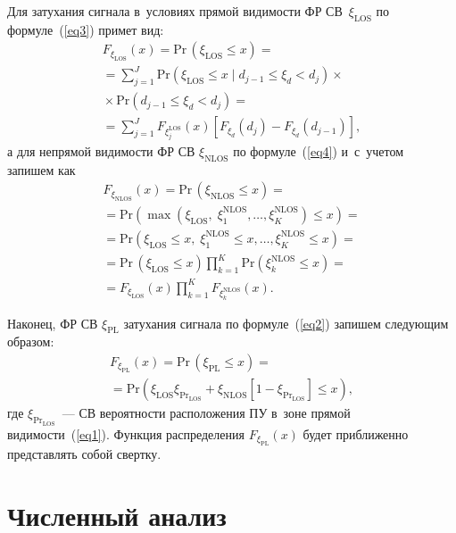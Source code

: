 \begin{multicols}{2}
Для затухания сигнала в~условиях прямой видимости ФР СВ~$\xi_{\mathrm{LOS}}$ по 
формуле~(\ref{eq3}) примет вид:
\begin{multline}
F_{\xi_{\mathrm{LOS}}}(x) =
\mathrm{Pr}\,(\xi_{\mathrm{LOS}} \leq x) = {} \\
{}= \sum\limits_{j=1}^J  \mathrm{Pr}\left(\xi_{\mathrm{LOS}} \leq x \mid d_{j-1} \leq \xi_d < d_j\right) \times{}\\
{}\times \mathrm{Pr}\left(d_{j-1} \leq  \xi_d < d_j\right) = {}\\
{} = \sum\limits_{j=1}^J F_{\xi_j^{\mathrm{LOS}}}(x) \left[ F_{\xi_d}(d_j) - 
F_{\xi_d}(d_{j-1}) \right], 
\label{eq6}
\end{multline}
а для непрямой видимости ФР СВ $\xi_{\mathrm{NLOS}}$ по формуле~(\ref{eq4}) 
и~с~учетом~\cite{Ventzel2018} запишем как
\begin{multline}
F_{\xi_{\mathrm{NLOS}}}(x)  =
\mathrm{Pr}\,(\xi_{\mathrm{NLOS}} \leq x) ={}\\
{}=
\mathrm{Pr}\left(\max{\left(\xi_{\mathrm{LOS}}, \; \xi^{\mathrm{NLOS}}_1, \ldots, \xi^{\mathrm{NLOS}}_K \right)} 
\leq x \right) = {} \\
{} = \mathrm{Pr}\left(\xi_{\mathrm{LOS}} \leq x, \; \xi^{\mathrm{NLOS}}_1 \leq x, \ldots, \xi^{\mathrm{NLOS}}_K 
\leq x \right) = {}\\
{} = \mathrm{Pr}\,(\xi_{\mathrm{LOS}} \leq x)  \prod\limits_{k=1}^K{\mathrm{Pr}\left(\xi^{\mathrm{NLOS}}_k \leq x 
\right)} = {}\\
{}=
F_{\xi_{\mathrm{LOS}}}(x)  \prod\limits_{k=1}^K F_{\xi_k^{\mathrm{NLOS}}}(x). 
\label{eq7}
\end{multline}

Наконец, ФР СВ $\xi_{\mathrm{PL}}$ затухания сигнала по формуле~(\ref{eq2}) запишем 
следующим образом:
\begin{multline*}
F_{\xi_{\mathrm{PL}}}(x) =
\mathrm{Pr}\,(\xi_{\mathrm{PL}} \leq x) ={}\\
{}=
\mathrm{Pr}\left(\xi_{\mathrm{LOS}}  \xi_{\mathrm{Pr}_{\mathrm{LOS}}} + \xi_{\mathrm{NLOS}} \left[1-
\xi_{\mathrm{Pr}_{\mathrm{LOS}}}\right] \leq x \right),
\end{multline*}
где $\xi_{\mathrm{Pr}_{\mathrm{LOS}}}$~--- СВ вероятности расположения ПУ в~зоне прямой 
видимости~(\ref{eq1}).
Функция распределения $F_{\xi_{\mathrm{PL}}}(x)$ будет приближенно представлять собой свертку.



\section{Численный анализ}



\end{multicols}
